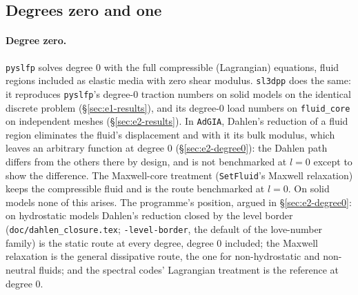 \documentclass[11pt]{article}
\numberwithin{equation}{section}
\newcommand{\code}[1]{\texttt{#1}}
\begin{document}
\subsection{Degrees zero and one}
\label{sec:degrees01}

\paragraph{Degree zero.} \code{pyslfp} solves degree 0 with the full
compressible (Lagrangian) equations, fluid regions included as elastic
media with zero shear modulus. \code{sl3dpp} does the same: it reproduces \code{pyslfp}'s degree-0
traction numbers on solid models on the identical discrete problem
(\S\ref{sec:e1-results}), and its degree-0 load numbers on
\code{fluid\_core} on independent meshes (\S\ref{sec:e2-results}). In
\code{AdGIA}, Dahlen's reduction of a fluid region eliminates the fluid's
displacement and with it its bulk modulus, which leaves an arbitrary
function at degree 0 (\S\ref{sec:e2-degree0}): the Dahlen path differs
from the others there by design, and is not benchmarked at $l=0$ except to
show the difference. The Maxwell-core treatment (\code{SetFluid}'s Maxwell
relaxation) keeps the compressible fluid and is the route benchmarked at
$l=0$. On solid models none of this arises. The programme's position,
argued in \S\ref{sec:e2-degree0}: on hydrostatic models Dahlen's
reduction closed by the level border (\code{doc/dahlen\_closure.tex};
\code{-level-border}, the default of the love-number family) is the
static route at every degree, degree 0 included; the Maxwell relaxation
is the general dissipative route, the one for non-hydrostatic and
non-neutral fluids; and the spectral codes' Lagrangian treatment is the
reference at degree 0.
\end{document}
